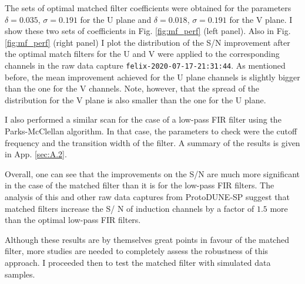The sets of optimal matched filter coefficients were obtained for the parameters $\delta = 0.035$, $\sigma = 0.191$ for the U plane and $\delta = 0.018$, $\sigma = 0.191$ for the V plane. I show these two sets of coefficients in Fig. \ref{fig:mf_perf} (left panel). Also in Fig. \ref{fig:mf_perf} (right panel) I plot the distribution of the S/N improvement after the optimal match filters for the U and V were applied to the corresponding channels in the raw data capture \texttt{felix-2020-07-17-21:31:44}. As mentioned before, the mean improvement achieved for the U plane channels is slightly bigger than the one for the V channels. Note, however, that the spread of the distribution for the V plane is also smaller than the one for the U plane.

I also performed a similar scan for the case of a low-pass FIR filter using the Parks-McClellan algorithm. In that case, the parameters to check were the cutoff frequency and the transition width of the filter. A summary of the results is given in App. \ref{sec:A.2}.

Overall, one can see that the improvements on the S/N are much more significant in the case of the matched filter than it is for the low-pass FIR filters. The analysis of this and other raw data captures from ProtoDUNE-SP suggest that matched filters increase the S/
N of induction channels by a factor of $1.5$ more than the optimal low-pass FIR filters.

Although these results are by themselves great points in favour of the matched filter, more studies are needed to completely assess the robustness of this approach. I proceeded then to test the matched filter with simulated data samples.

